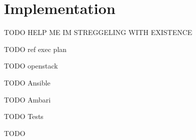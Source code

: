 \chapter{Implementation}
\label{chap:impl}

TODO HELP ME IM STREGGELING WITH EXISTENCE

TODO ref exec plan

TODO openstack

TODO Ansible

TODO Ambari

TODO Tests


TODO
